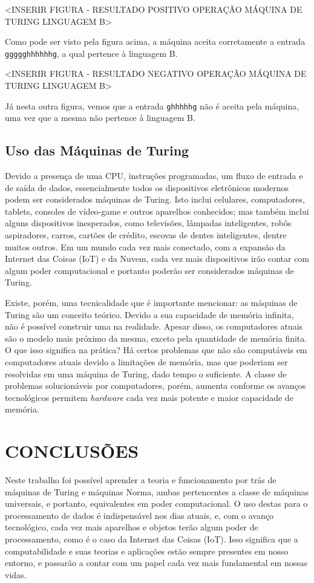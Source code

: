 \documentclass[12pt,fleqn]{article}
\begin{document}
<INSERIR FIGURA - RESULTADO POSITIVO OPERAÇÃO MÁQUINA DE TURING LINGUAGEM B>

Como pode ser visto pela figura acima, a máquina aceita corretamente a entrada
\verb|ggggghhhhhhg|, a qual pertence à linguagem B.

<INSERIR FIGURA - RESULTADO NEGATIVO OPERAÇÃO MÁQUINA DE TURING LINGUAGEM B>

Já nesta outra figura, vemos que a entrada \verb|ghhhhhg| não é aceita pela
máquina, uma vez que a mesma não pertence à linguagem B.

\subsection{Uso das Máquinas de Turing}
Devido a presença de uma CPU, instruções programadas, um fluxo de entrada e de
saída de dados, essencialmente todos os dispositivos eletrônicos modernos podem
ser considerados máquinas de Turing. Isto inclui celulares, computadores,
tablets, consoles de vídeo-game e outros aparelhos conhecidos; mas também inclui
alguns dispositivos inesperados, como televisões, lâmpadas inteligentes, robôs
aspiradores, carros, cartões de crédito, escovas de dentes inteligentes, dentre
muitos outros. Em um mundo cada vez mais conectado, com a expansão da Internet
das Coisas (IoT) e da Nuvem, cada vez mais dispositivos irão contar com algum
poder computacional e portanto poderão ser considerados máquinas de Turing.

Existe, porém, uma tecnicalidade que é importante mencionar: as máquinas de
Turing são um conceito teórico. Devido a sua capacidade de memória infinita, não
é possível construir uma na realidade. Apesar disso, os computadores atuais são
o modelo mais próximo da mesma, exceto pela quantidade de memória finita. O que
isso significa na prática? Há certos problemas que não são computáveis em
computadores atuais devido a limitações de memória, mas que poderiam ser
resolvidas em uma máquina de Turing, dado tempo o suficiente. A classe de
problemas solucionáveis por computadores, porém, aumenta conforme os avanços
tecnológicos permitem \textit{hardware} cada vez mais potente e maior capacidade
de memória.

\newpage
\section{CONCLUSÕES}
Neste trabalho foi possível aprender a teoria e funcionamento por trás de
máquinas de Turing e máquinas Norma, ambas pertencentes a classe de máquinas
universais, e portanto, equivalentes em poder computacional. O uso destas para o
processamento de dados é indispensável nos dias atuais, e, com o avanço
tecnológico, cada vez mais aparelhos e objetos terão algum poder de
processamento, como é o caso da Internet das Coisas (IoT). Isso significa que a
computabilidade e suas teorias e aplicações estão sempre presentes em nosso
entorno, e passarão a contar com um papel cada vez mais fundamental em nossas
vidas.
\end{document}
